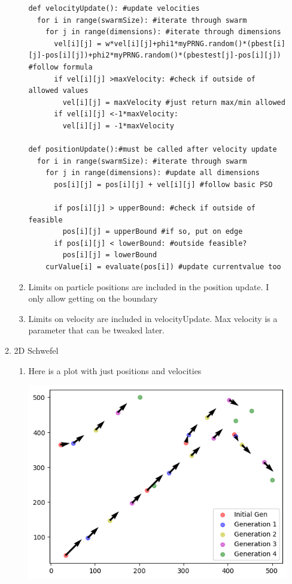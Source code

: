\documentclass[11pt]{article}
\begin{document}
\begin{enumerate}
\begin{enumerate}
\begin{enumerate}
\begin{verbatim}
def velocityUpdate(): #update velocities
  for i in range(swarmSize): #iterate through swarm
    for j in range(dimensions): #iterate through dimensions
      vel[i][j] = w*vel[i][j]+phi1*myPRNG.random()*(pbest[i][j]-pos[i][j])+phi2*myPRNG.random()*(pbestest[j]-pos[i][j]) #follow formula
      if vel[i][j] >maxVelocity: #check if outside of allowed values
        vel[i][j] = maxVelocity #just return max/min allowed
      if vel[i][j] <-1*maxVelocity:
        vel[i][j] = -1*maxVelocity

def positionUpdate():#must be called after velocity update
  for i in range(swarmSize): #iterate through swarm
    for j in range(dimensions): #update all dimensions
      pos[i][j] = pos[i][j] + vel[i][j] #follow basic PSO

      if pos[i][j] > upperBound: #check if outside of feasible
        pos[i][j] = upperBound #if so, put on edge
      if pos[i][j] < lowerBound: #outside feasible?
        pos[i][j] = lowerBound
    curValue[i] = evaluate(pos[i]) #update currentvalue too
\end{verbatim}
\item Limits on particle positions are included in the position update.  I only allow getting on the boundary
\item Limits on velocity are included in velocityUpdate.  Max velocity is a parameter that can be tweaked later.
\end{enumerate}
\item 2D Schwefel
\begin{enumerate}
\item Here is a plot with just positions and velocities

\includegraphics{plot2.png}


\end{enumerate}
\end{enumerate}
\end{enumerate}
\end{document}
